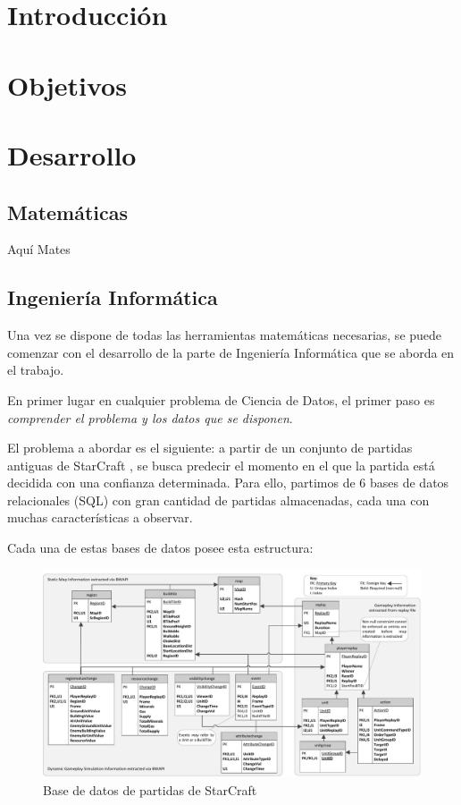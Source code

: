 \documentclass[a4paper,11pt]{book}\usepackage[]{graphicx}\usepackage[]{color}
\makeatletter
\def\maxwidth{ %
  \ifdim\Gin@nat@width>\linewidth
    \linewidth
  \else
    \Gin@nat@width
  \fi
}
\makeatother
\begin{document}
%
%
\tableofcontents
%





\chapter{Introducción}


\chapter{Objetivos} 


\chapter{Desarrollo}
\section{Matemáticas}
Aquí Mates
\section{Ingeniería Informática}
Una vez se dispone de todas las herramientas matemáticas necesarias, se puede comenzar con el desarrollo de la parte de Ingeniería Informática que se aborda en el trabajo.

En primer lugar en cualquier problema de Ciencia de Datos, el primer paso es \emph{comprender el problema y los datos que se disponen}.

El problema a abordar es el siguiente: a partir de un conjunto de partidas antiguas de StarCraft \cite{dataset2014}, se busca predecir el momento en el que la partida está decidida con una confianza determinada. Para ello, partimos de 6 bases de datos relacionales (SQL) con gran cantidad de partidas almacenadas, cada una con muchas características a observar.

Cada una de estas bases de datos posee esta estructura:


\begin{figure}
    \centering
    \includegraphics[width=\maxwidth]{figure/Robertson14DatabaseDiagram}
    \caption{Base de datos de partidas de StarCraft}
\end{figure}
\end{document}
